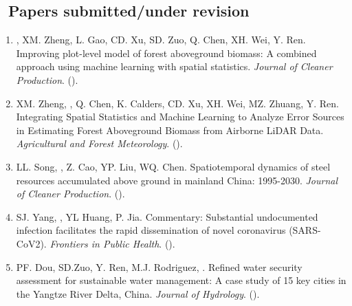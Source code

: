 \subsection*{\texorpdfstring{\faBook\ Papers submitted/under revision}{Papers submitted/under revision}}
\begin{enumerate}
\item
    \Shaoqing\CF, XM. Zheng, L. Gao, CD. Xu, SD. Zuo, Q. Chen, XH. Wei, Y. Ren.
    Improving plot-level model of forest aboveground biomass: A combined approach using machine learning with spatial statistics.
    \textit{Journal of Cleaner Production}. 
    (\Review).
\item
    XM. Zheng, \Shaoqing, Q. Chen, K. Calders, CD. Xu, XH. Wei, MZ. Zhuang, Y. Ren.
    Integrating Spatial Statistics and Machine Learning to Analyze Error Sources in Estimating Forest Aboveground Biomass from Airborne LiDAR Data.
    \textit{Agricultural and Forest Meteorology}. 
    (\Revision).
\item
    LL. Song, \Shaoqing, Z. Cao, YP. Liu, WQ. Chen.
    Spatiotemporal dynamics of steel resources accumulated above ground in mainland China: 1995-2030.
    \textit{Journal of Cleaner Production}. 
    (\Review).
\item
    SJ. Yang, \Shaoqing, YL Huang, P. Jia.
    Commentary: Substantial undocumented infection facilitates the rapid dissemination of novel coronavirus (SARS-CoV2).
    \textit{Frontiers in Public Health}. 
    (\Review).
\item
    PF. Dou, SD.Zuo, Y. Ren, M.J. Rodriguez, \Shaoqing.
    Refined water security assessment for sustainable water management: A case study of 15 key cities in the Yangtze River Delta, China.
    \textit{Journal of Hydrology}.
    (\Revision).
\end{enumerate}